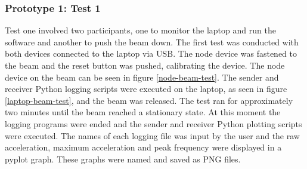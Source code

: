 \subsubsection{Prototype 1: Test 1}
Test one involved two participants, one to monitor the laptop and run the software and another to push the beam down. The first test was conducted with both devices connected to the laptop via USB. The node device was fastened to the beam and the reset button was pushed, calibrating the device. The node device on the beam can be seen in figure \ref{node-beam-test}. The sender and receiver Python logging scripts were executed on the laptop, as seen in figure \ref{laptop-beam-test}, and the beam was released. The test ran for approximately two minutes until the beam reached a stationary state. At this moment the logging programs were ended and the sender and receiver Python plotting scripts were executed. The names of each logging file was input by the user and the raw acceleration, maximum acceleration and peak frequency were displayed in a pyplot graph. These graphs were named and saved as PNG files. 

